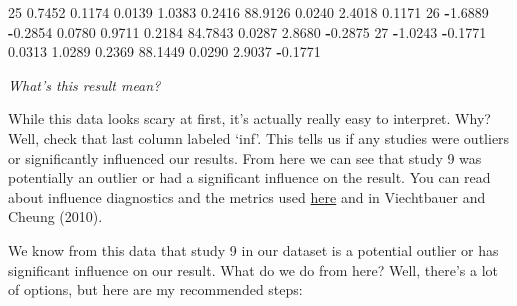 \documentclass[
]{book}
\newenvironment{Shaded}{\begin{snugshade}}{\end{snugshade}}
\newcommand{\DecValTok}[1]{\textcolor[rgb]{0.00,0.00,0.81}{#1}}
\newcommand{\FloatTok}[1]{\textcolor[rgb]{0.00,0.00,0.81}{#1}}
\newcommand{\SpecialCharTok}[1]{\textcolor[rgb]{0.81,0.36,0.00}{\textbf{#1}}}
\begin{document}
\begin{Shaded}
\begin{Highlighting}[]
\DecValTok{25}   \FloatTok{0.7452}  \FloatTok{0.1174} \FloatTok{0.0139} \FloatTok{1.0383}   \FloatTok{0.2416} \FloatTok{88.9126} \FloatTok{0.0240} \FloatTok{2.4018}  \FloatTok{0.1171}     
\DecValTok{26}  \SpecialCharTok{{-}}\FloatTok{1.6889} \SpecialCharTok{{-}}\FloatTok{0.2854} \FloatTok{0.0780} \FloatTok{0.9711}   \FloatTok{0.2184} \FloatTok{84.7843} \FloatTok{0.0287} \FloatTok{2.8680} \SpecialCharTok{{-}}\FloatTok{0.2875}     
\DecValTok{27}  \SpecialCharTok{{-}}\FloatTok{1.0243} \SpecialCharTok{{-}}\FloatTok{0.1771} \FloatTok{0.0313} \FloatTok{1.0289}   \FloatTok{0.2369} \FloatTok{88.1449} \FloatTok{0.0290} \FloatTok{2.9037} \SpecialCharTok{{-}}\FloatTok{0.1771}
\end{Highlighting}
\end{Shaded}

\emph{What's this result mean?}

While this data looks scary at first, it's actually really easy to interpret. Why? Well, check that last column labeled `inf'. This tells us if any studies were outliers or significantly influenced our results. From here we can see that study 9 was potentially an outlier or had a significant influence on the result. You can read about influence diagnostics and the metrics used \href{https://wviechtb.github.io/metafor/reference/influence.rma.uni.html}{here} and in Viechtbauer and Cheung (2010)\citep{viechtbauer2010b}.

We know from this data that study 9 in our dataset is a potential outlier or has significant influence on our result. What do we do from here? Well, there's a lot of options, but here are my recommended steps:
\end{document}
